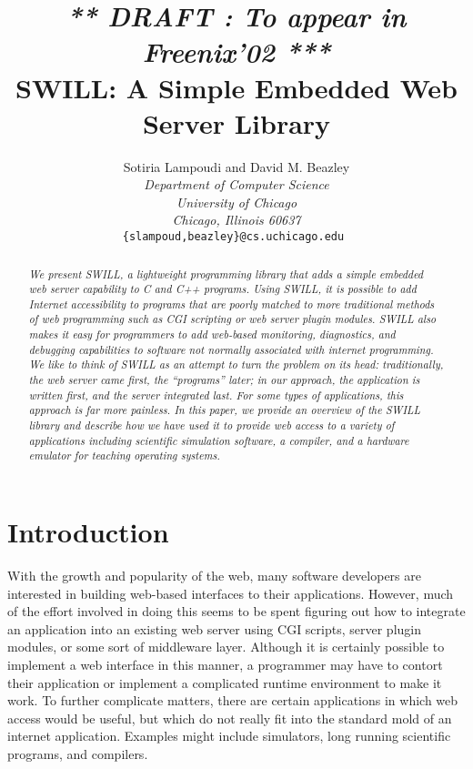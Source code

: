 \title{
{\large \em *** DRAFT : To appear in Freenix'02 ***} \\
{\Large \bf   SWILL: A Simple Embedded Web Server Library}}

\author{Sotiria Lampoudi and David M. Beazley \\
{\em Department of Computer Science} \\
{\em University of Chicago }\\
{\em Chicago, Illinois 60637 }\\
{\tt \{slampoud,beazley\}@cs.uchicago.edu }}

\maketitle

\thispagestyle{empty}
\begin{abstract}

{\em
We present SWILL, a lightweight programming library that adds a simple
embedded web server capability to C and C++ programs.  Using SWILL, it
is possible to add Internet accessibility to programs that are poorly
matched to more traditional methods of web programming such as CGI
scripting or web server plugin modules.  SWILL also makes it easy for
programmers to add web-based monitoring, diagnostics, and debugging
capabilities to software not normally associated with internet
programming.  
We like to think of SWILL as an attempt to turn
the problem on its head: traditionally, the web server came first, the 
``programs'' later; in our approach, the application is written first, and the 
server integrated last. For some types of applications, this 
approach is far more painless.
In this paper, we provide an overview of the SWILL 
library and describe how we have used it to provide web access to a 
variety of applications including scientific simulation software, 
a compiler, and a hardware emulator for teaching operating systems.
}

\end{abstract}

\section{Introduction}

With the growth and popularity of the web, many software developers
are interested in building web-based interfaces to their applications.
However, much of the effort involved in doing this seems to be spent figuring
out how to integrate an application into an existing web server using
CGI scripts, server plugin modules, or some sort of middleware
layer. Although it is certainly possible to implement a web interface
in this manner, a programmer may have to contort their application or
implement a complicated runtime environment to make it work. To
further complicate matters, there are certain applications in which
web access would be useful, but which do not really fit into the standard mold
of an internet application.  Examples might include simulators, long
running scientific programs, and compilers. 

